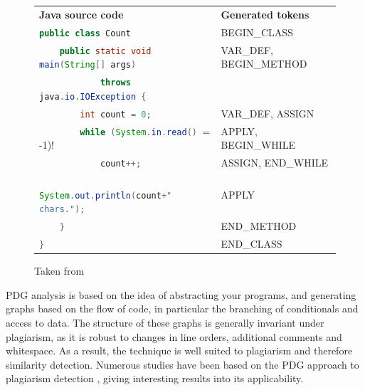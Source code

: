 \begin{figure}[H]
\begin{tabular}{l l}
\textbf{Java source code} & \textbf{Generated tokens} \\
\lstinline[language=Java]!public class Count! & BEGIN\_CLASS \\
\lstinline[language=Java]!    public static void main(String[] args)! & VAR\_DEF, BEGIN\_METHOD \\
\lstinline[language=Java]!            throws java.io.IOException {! \\
\lstinline[language=Java]!        int count = 0;! & VAR\_DEF, ASSIGN \\
\lstinline[language=Java]!        while (System.in.read() != -1)! & APPLY, BEGIN\_WHILE \\
\lstinline[language=Java]!            count++;! & ASSIGN, END\_WHILE \\
\lstinline[language=Java]!        System.out.println(count+" chars.");! & APPLY \\
\lstinline[language=Java]!    }! & END\_METHOD \\
\lstinline[language=Java]!}! & END\_CLASS \\
\end{tabular}
\caption{Taken from \citep[p.~1020]{JPlag}}
\label{fig:JPlagTokenCreation}
\end{figure}


PDG analysis is based on the idea of abstracting your programs, and generating
graphs based on the flow of code, in particular the branching of conditionals
and access to data\cite{PDGOptimisation}. The structure of these graphs
is generally invariant under plagiarism, as it is robust to changes in line
orders, additional comments and whitespace\cite{GPLAG}. As a result, the technique is well
suited to plagiarism and therefore similarity detection. Numerous studies have been based
on the PDG approach to plagiarism detection\cite{GPLAG} \cite{OtherPDG}, giving
interesting results into its applicability.

